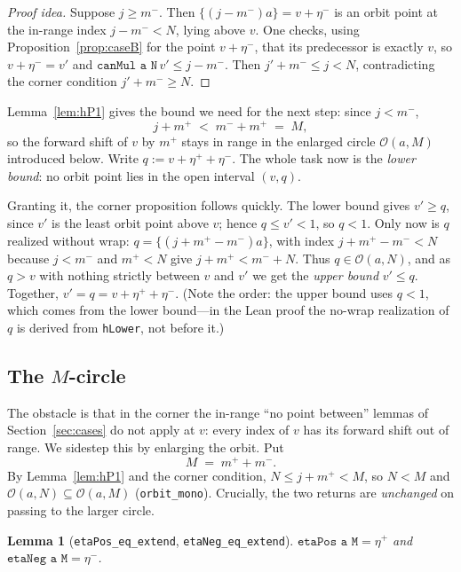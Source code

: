 \documentclass[11pt,reqno]{amsart}
\theoremstyle{plain}
\newtheorem{lemma}[theorem]{Lemma}
\theoremstyle{definition}
\theoremstyle{remark}
\newcommand{\fract}[1]{\{#1\}}
\newcommand{\etap}{\eta^{+}}
\newcommand{\etam}{\eta^{-}}
\newcommand{\mpl}{m^{+}}
\newcommand{\mmi}{m^{-}}
\newcommand{\orb}{\mathcal{O}}
\newcommand{\code}[1]{\texttt{#1}}
\begin{document}
\begin{proof}[Proof idea]
Suppose $j\ge\mmi$.  Then $\fract{(j-\mmi)a}=v+\etam$ is an orbit point at the
in-range index $j-\mmi<N$, lying above $v$.  One checks, using
Proposition~\ref{prop:caseB} for the point $v+\etam$, that its predecessor is
exactly $v$, so $v+\etam=v'$ and $\code{canMul a N}\,v'\le j-\mmi$.  Then
$j'+\mmi\le j<N$, contradicting the corner condition $j'+\mmi\ge N$.
\end{proof}

Lemma~\ref{lem:hP1} gives the bound we need for the next step: since $j<\mmi$,
\[
  j+\mpl \;<\; \mmi+\mpl \;=\; M ,
\]
so the forward shift of $v$ by $\mpl$ stays in range in the enlarged circle
$\orb(a,M)$ introduced below.  Write $q:=v+\etap+\etam$.  The whole task now is
the \emph{lower bound}: no orbit point lies in the open interval $(v,q)$.

Granting it, the corner proposition follows quickly.  The lower bound gives
$v'\ge q$, since $v'$ is the least orbit point above $v$; hence
$q\le v'<1$, so $q<1$.  Only now is $q$ realized without wrap:
$q=\fract{(j+\mpl-\mmi)a}$, with index $j+\mpl-\mmi<N$ because $j<\mmi$ and
$\mpl<N$ give $j+\mpl<\mmi+N$.  Thus $q\in\orb(a,N)$, and as $q>v$ with nothing
strictly between $v$ and $v'$ we get the \emph{upper bound} $v'\le q$.  Together,
$v'=q=v+\etap+\etam$.  (Note the order: the upper bound uses $q<1$, which comes
from the lower bound---in the Lean proof the no-wrap realization of $q$ is
derived from \code{hLower}, not before it.)

\subsection{The \texorpdfstring{$M$}{M}-circle}

The obstacle is that in the corner the in-range ``no point between'' lemmas of
Section~\ref{sec:cases} do not apply at $v$: every index of $v$ has its forward
shift out of range.  We sidestep this by enlarging the orbit.  Put
\[
  M \;=\; \mpl+\mmi .
\]
By Lemma~\ref{lem:hP1} and the corner condition, $N\le j+\mpl<M$, so $N<M$ and
$\orb(a,N)\subseteq\orb(a,M)$ (\code{orbit\_mono}).  Crucially, the two returns
are \emph{unchanged} on passing to the larger circle.

\begin{lemma}[\code{etaPos\_eq\_extend}, \code{etaNeg\_eq\_extend}]
\label{lem:returns-preserved}
$\code{etaPos a M}=\etap$ and $\code{etaNeg a M}=\etam$.
\end{lemma}
\end{document}
